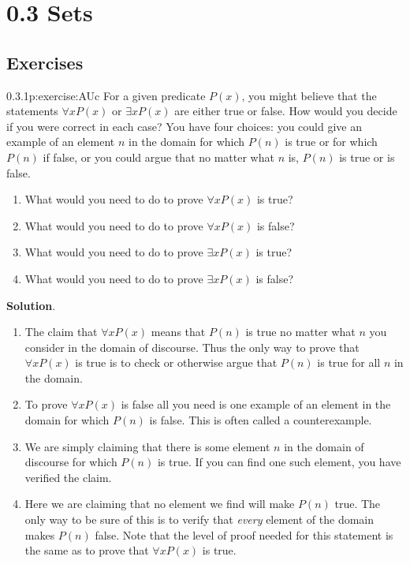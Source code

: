 \documentclass[twoside,11pt,]{book}
\newcommand{\blocktitlefont}{\relax}
\numberwithin{equation}{chapter}
\begin{document}
\section*{0.3 Sets}
\subsection*{Exercises}
\begin{divisionsolution}{0.3.1}{}{p:exercise:AUc}%
For a given predicate \(P(x)\text{,}\) you might believe that the statements \(\forall x P(x)\) or \(\exists x P(x)\) are either true or false. How would you decide if you were correct in each case?  You have four choices: you could give an example of an element \(n\) in the domain for which \(P(n)\) is true or for which \(P(n)\) if false, or you could argue that no matter what \(n\) is, \(P(n)\) is true or is false.%
\begin{enumerate}[label=(\alph*)]
\item{}What would you need to do to prove \(\forall x P(x)\) is true?%
\item{}What would you need to do to prove \(\forall x P(x)\) is false?%
\item{}What would you need to do to prove \(\exists x P(x)\) is true?%
\item{}What would you need to do to prove \(\exists x P(x)\) is false?%
\end{enumerate}
%
\par\smallskip%
\noindent\textbf{\blocktitlefont Solution}.\quad{}%
\begin{enumerate}[label=(\alph*)]
\item{}The claim that \(\forall x P(x)\) means that \(P(n)\) is true no matter what \(n\) you consider in the domain of discourse. Thus the only way to prove that \(\forall x P(x)\) is true is to check or otherwise argue that \(P(n)\) is true for all \(n\) in the domain.%
\item{}To prove \(\forall x P(x)\) is false all you need is one example of an element in the domain for which \(P(n)\) is false. This is often called a counterexample.%
\item{}We are simply claiming that there is some element \(n\) in the domain of discourse for which \(P(n)\) is true. If you can find one such element, you have verified the claim.%
\item{}Here we are claiming that no element we find will make \(P(n)\) true. The only way to be sure of this is to verify that \emph{every} element of the domain makes \(P(n)\) false. Note that the level of proof needed for this statement is the same as to prove that \(\forall x P(x)\) is true.%
\end{enumerate}
%
\end{divisionsolution}%
\end{document}
